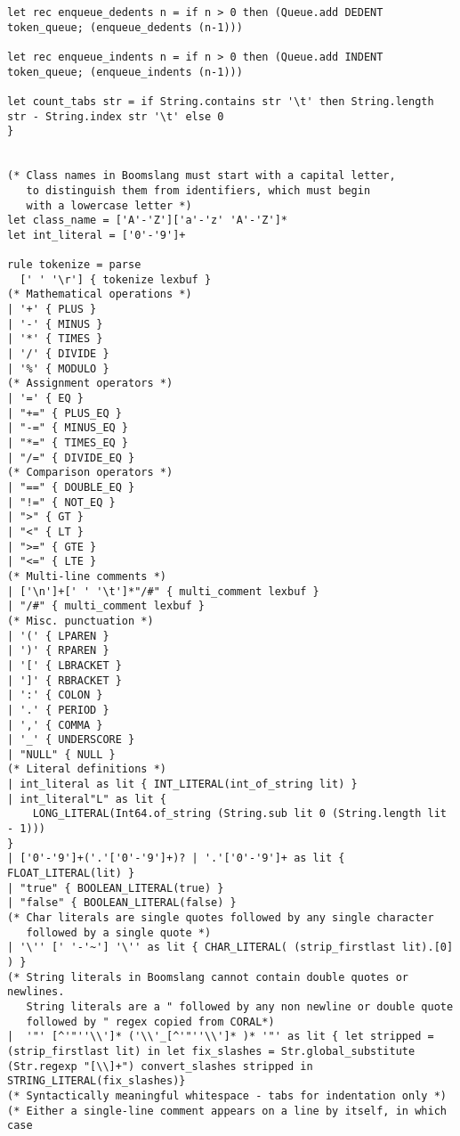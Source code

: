 \documentclass{article}
\begin{document}
\begin{verbatim}
let rec enqueue_dedents n = if n > 0 then (Queue.add DEDENT token_queue; (enqueue_dedents (n-1)))

let rec enqueue_indents n = if n > 0 then (Queue.add INDENT token_queue; (enqueue_indents (n-1)))

let count_tabs str = if String.contains str '\t' then String.length str - String.index str '\t' else 0
}


(* Class names in Boomslang must start with a capital letter,
   to distinguish them from identifiers, which must begin
   with a lowercase letter *)
let class_name = ['A'-'Z']['a'-'z' 'A'-'Z']*
let int_literal = ['0'-'9']+

rule tokenize = parse
  [' ' '\r'] { tokenize lexbuf }
(* Mathematical operations *)
| '+' { PLUS }
| '-' { MINUS }
| '*' { TIMES }
| '/' { DIVIDE }
| '%' { MODULO }
(* Assignment operators *)
| '=' { EQ }
| "+=" { PLUS_EQ }
| "-=" { MINUS_EQ }
| "*=" { TIMES_EQ }
| "/=" { DIVIDE_EQ }
(* Comparison operators *)
| "==" { DOUBLE_EQ }
| "!=" { NOT_EQ }
| ">" { GT }
| "<" { LT }
| ">=" { GTE }
| "<=" { LTE }
(* Multi-line comments *)
| ['\n']+[' ' '\t']*"/#" { multi_comment lexbuf }
| "/#" { multi_comment lexbuf }
(* Misc. punctuation *)
| '(' { LPAREN }
| ')' { RPAREN }
| '[' { LBRACKET }
| ']' { RBRACKET }
| ':' { COLON }
| '.' { PERIOD }
| ',' { COMMA }
| '_' { UNDERSCORE }
| "NULL" { NULL }
(* Literal definitions *)
| int_literal as lit { INT_LITERAL(int_of_string lit) }
| int_literal"L" as lit {
    LONG_LITERAL(Int64.of_string (String.sub lit 0 (String.length lit - 1)))
}
| ['0'-'9']+('.'['0'-'9']+)? | '.'['0'-'9']+ as lit { FLOAT_LITERAL(lit) }
| "true" { BOOLEAN_LITERAL(true) }
| "false" { BOOLEAN_LITERAL(false) }
(* Char literals are single quotes followed by any single character
   followed by a single quote *)
| '\'' [' '-'~'] '\'' as lit { CHAR_LITERAL( (strip_firstlast lit).[0] ) }
(* String literals in Boomslang cannot contain double quotes or newlines.
   String literals are a " followed by any non newline or double quote
   followed by " regex copied from CORAL*)
|  '"' [^'"''\\']* ('\\'_[^'"''\\']* )* '"' as lit { let stripped = (strip_firstlast lit) in let fix_slashes = Str.global_substitute (Str.regexp "[\\]+") convert_slashes stripped in STRING_LITERAL(fix_slashes)}
(* Syntactically meaningful whitespace - tabs for indentation only *)
(* Either a single-line comment appears on a line by itself, in which case

\end{verbatim}
\end{document}
